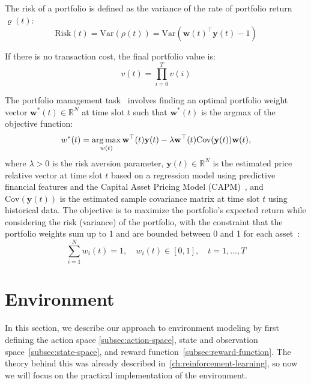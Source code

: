 \documentclass[../xlapes02]{subfiles}
\begin{document}
    The risk of a portfolio is defined as the variance of the rate of portfolio return $\varrho(t)$:
    \begin{equation}
        \text{Risk}(t)=\text{Var}(\rho(t))=\text{Var}(\mathbf{w}(t)^\top \mathbf{y}(t) - 1)
    \end{equation}

    If there is no transaction cost, the final portfolio value is:
    \begin{equation}
        \label{eq:portfolio-value}
        v(t) = \prod_{i=0}^{T} v(i)
    \end{equation}

    The portfolio management task~\cite{enwiki:1043516653} involves finding an optimal portfolio weight vector $\mathbf{w}^*(t) \in \mathbb{R}^N$ at time slot $t$ such that $\mathbf{w}^*(t)$ is the argmax of the objective function:
    \begin{equation}
        w^*(t)=\operatorname*{arg\,max}_{w(t)}\mathbf{w}^\top(t)\mathbf{y}(t)-\lambda\mathbf{w}^\top(t)\text{Cov}(\mathbf{y}(t))\mathbf{w}(t),
    \end{equation}
    where $\lambda > 0$ is the risk aversion parameter, $\mathbf{y}(t) \in \mathbb{R}^N$ is the estimated price relative vector at time slot $t$ based on a regression model using predictive financial features and the Capital Asset Pricing Model (CAPM)~\cite{fama-2004}, and $\text{Cov}(\mathbf{y}(t))$ is the estimated sample covariance matrix at time slot $t$ using historical data. The objective is to maximize the portfolio's expected return while considering the risk (variance) of the portfolio, with the constraint that the portfolio weights sum up to 1 and are bounded between 0 and 1 for each asset~\cite{finrl-portfolio-allocation-2020}:
    \begin{equation}
        \sum_{i=1}^{N}w_i(t)=1,\quad w_i(t)\in[0,1],\quad t=1,\ldots,T
    \end{equation}


    \section{Environment}\label{sec:environment}
    In this section, we describe our approach to environment modeling by first defining the action space \cref{subsec:action-space}, state and observation space~\cref{subsec:state-space}, and reward function~\cref{subsec:reward-function}. The theory behind this was already described in~\cref{ch:reinforcement-learning}, so now we will focus on the practical implementation of the environment.
\end{document}
